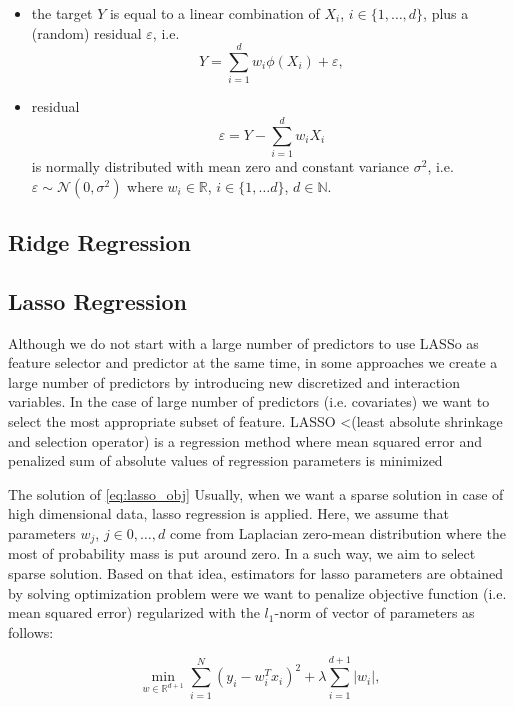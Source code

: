 \documentclass{article}
\begin{document}
\begin{itemize}
  \item the target $Y$ is equal to a linear combination of $X_i$, $i\in\{1,\ldots, d\}$, plus a (random) residual $\varepsilon$, i.e.
  \begin{equation}
    Y = \sum_{i=1}^d w_i \phi(X_i) + \varepsilon,
  \end{equation}
  \item residual $$\varepsilon = Y - \sum_{i=1}^d w_iX_i $$
  is normally distributed with mean zero and constant variance $\sigma^2$, i.e. $\varepsilon\sim \mathcal{N}(0,\sigma^2)$ where $w_i\in\mathbb{R}$, $i\in\{1,\ldots d\}$, $d\in \mathbb{N}$.
\end{itemize}



\subsection{Ridge Regression}
\subsection{Lasso Regression}
Although we do not start with a large number of predictors to use LASSo as feature selector and predictor at the same time, in some approaches we create a large number of predictors by introducing new discretized and interaction variables. In the case of large number of predictors (i.e. covariates) we want to select the most appropriate subset of feature. LASSO \cite{tibshiraniRegressionShrinkageSelection1996} <(least absolute shrinkage and selection operator) is a regression method where mean squared error and penalized sum of absolute values of regression parameters is minimized



The solution of \ref{eq:lasso_obj}
Usually, when we want a sparse solution in case of high dimensional data, lasso regression is applied. Here, we assume that parameters $w_j$, $j\in {0,\ldots, d}$ come from Laplacian zero-mean distribution where the most of probability mass is put around zero. In a such way, we aim to select sparse solution. Based on that idea, estimators for lasso parameters are obtained by solving optimization problem were we want to penalize objective function (i.e. mean squared error) regularized with the $l_1$-norm of vector of parameters as follows:

\begin{equation}\label{eq:lasso_obj}
  \min_{w\in \mathbb{R}^{d+1}} \sum_{i=1}^N(y_i-w_i^Tx_i)^2 + \lambda\sum_{i=1}^{d+1}|w_i|,
\end{equation}
\end{document}
